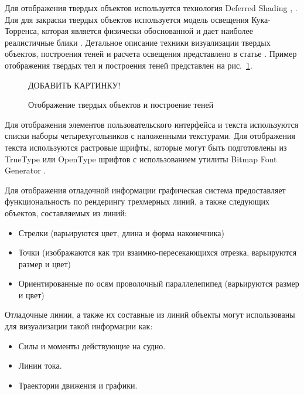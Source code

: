 Для отображения твердых объектов используется технология Deferred Shading \citep{stalker}, \citep{killzone}.
Для для закраски твердых объектов используется модель освещения Кука-Торренса, которая является физически обоснованной \citep{cook_torrance} и дает наиболее реалистичные блики \citep{ngan}.
Детальное описание техники визуализации твердых объектов, построения теней и расчета освещения представлено в статье \citep{bezgodov08}.
Пример отображения твердых тел и построения теней представлен на рис.~\ref{solid_rendering}.

\begin{figure}[ht]
\begin{center}
\LARGE{ДОБАВИТЬ КАРТИНКУ!}
\end{center}
\caption{Отображение твердых объектов и построение теней}
\label{solid_rendering}
\end{figure}



Для отображения элементов пользовательского интерфейса и текста используются списки наборы четырехугольников с наложенными текстурами.
Для отображения текста используются растровые шрифты, которые могут быть подготовлены из TrueType или OpenType шрифтов с использованием утилиты Bitmap Font Generator \citep{bmfont}.

Для отображения отладочной информации графическая система предоставляет функциональность по рендерингу трехмерных линий, 
а также следующих объектов, составляемых из линий:

\begin{itemize}
	\item	Стрелки (варьируются цвет, длина и форма наконечника)
	\item	Точки (изображаются как три взаимно-пересекающихся отрезка, варьируются размер и цвет)
	\item	Ориентированные по осям проволочный параллелепипед (варьируются размер и цвет)
\end{itemize}

Отладочные линии, а также их составные из линий объекты могут использованы для визуализации такой информации как:
\begin{itemize}
	\item	Силы и моменты действующие на судно.
	\item	Линии тока.
	\item	Траектории движения и графики.
\end{itemize}

